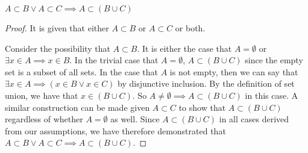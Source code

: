 \documentclass[main.tex]{subfiles}
\begin{document}
\begin{thm}
	\(A \subset B \lor A \subset C \implies A \subset (B \cup C)\)
\end{thm}
\begin{proof}
	It is given that either \(A \subset B\) or \(A \subset C\) or both.

	Consider the possibility that \(A \subset B\). It is either the case
	that \(A = \emptyset\) or \(\exists x \in A \implies x \in B\). In the
	trivial case that \(A = \emptyset\), \(A \subset (B \cup C)\) since the
	empty set is a subset of all sets. In the case that \(A\) is not empty,
	then we can say that \(\exists x \in A \implies (x \in B \lor x \in C)\)
	by disjunctive inclusion. By the definition of set union, we have that
	\(x \in (B \cup C)\). So
	\(A \neq \emptyset \implies A \subset (B \cup C)\) in this case. A
	similar construction can be made given \(A \subset C\) to show that
	\(A \subset (B \cup C)\) regardless of whether \(A = \emptyset\) as
	well. Since \(A \subset (B \cup C)\) in all cases derived from our
	assumptions, we have therefore demonstrated that
	\(A \subset B \lor A \subset C \implies A \subset (B \cup C)\).
\end{proof}
\end{document}
